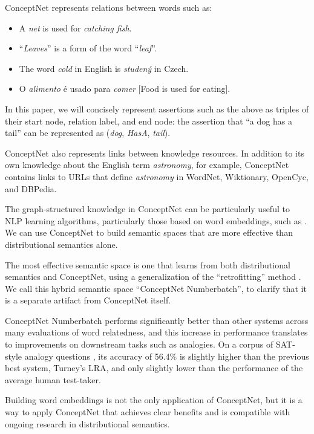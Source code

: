 \documentclass[letterpaper]{article}
\begin{document}
ConceptNet represents relations between words such as:

\begin{itemize}
    \item A \emph{net} is used for \emph{catching fish}.
    \item ``\emph{Leaves}'' is a form of the word ``\emph{leaf}''.
    \item The word \emph{cold} in English is \emph{studený} in Czech.
    \item O \emph{alimento} é usado para \emph{comer} [Food is used for eating].
\end{itemize}

In this paper, we will concisely represent assertions such as the above as triples of
their start node, relation label, and end node: the assertion that ``a dog has
a tail'' can be represented as (\emph{dog}, \emph{HasA}, \emph{tail}).

ConceptNet also represents links between knowledge resources. In addition to
its own knowledge about the English term \emph{astronomy}, for example,
ConceptNet contains links to URLs that define \emph{astronomy} in WordNet,
Wiktionary, OpenCyc, and DBPedia.

The graph-structured knowledge in ConceptNet can be particularly useful to NLP
learning algorithms, particularly those based on word embeddings, such as
\cite{mikolov2013word2vec}. We can use ConceptNet to build semantic spaces that
are more effective than distributional semantics alone.

The most effective semantic space is one that learns from both distributional
semantics and ConceptNet, using a generalization of the ``retrofitting'' method
\cite{faruqui2015retrofitting}. We call this hybrid semantic space ``ConceptNet
Numberbatch'', to clarify that it is a separate artifact from ConceptNet
itself.

ConceptNet Numberbatch performs significantly better than other systems across
many evaluations of word relatedness, and this increase in performance
translates to improvements on downstream tasks such as analogies.  On a
corpus of SAT-style analogy questions \cite{turney2006lra}, its accuracy of
56.4\% is slightly higher than the previous best system, Turney's LRA, and only
slightly lower than the performance of the average human test-taker.

Building word embeddings is not the only application of ConceptNet, but it is a
way to apply ConceptNet that achieves clear benefits and is compatible with
ongoing research in distributional semantics.
\end{document}
